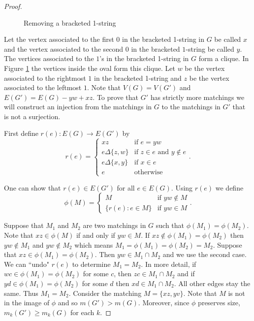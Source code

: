 \documentclass[12pt]{amsart}
\theoremstyle{plain}
\theoremstyle{definition}
\begin{document}
\begin{proof}
\begin{figure}[!ht]
\begin{center}
\caption{Removing a bracketed 1-string}
\label{fig:Bracketed1StringA}
\end{center}
\end{figure}

  
Let the vertex associated to the first 0 in the bracketed 1-string in $G$ be called $x$ and the vertex associated to the second 0 in the bracketed $1$-string be called $y$.  The vertices associated to the $1$'s in the bracketed 1-string in $G$ form a clique.  In Figure \ref{fig:Bracketed1StringA} the vertices inside the oval form this clique.  Let $w$ be the vertex associated to the rightmost $1$ in the bracketed 1-string and $z$ be the vertex associated to the leftmost $1$.    %
Note that $V(G) = V(G')$ and $E(G')= E(G)-yw+xz$. To prove that $G'$ has strictly more matchings we will construct an injection from the matchings in $G$ to the matchings in $G'$ that is not a surjection.


First define $r(e): E(G)\to E(G')$ by
$$r(e)=
\begin{cases}
xz  &\text{if $e=yw$}\\
e\Delta \{z,w\} &\text{if $z\in e$ and $y\notin e$}\\
e\Delta \{x,y\} &\text{if $x\in e$}\\%
e  &\text{otherwise}
\end{cases}.$$

One can show that $r(e)\in E(G')$ for all $e\in E(G)$.  Using $r(e)$ we define 
$$\phi(M)=
\begin{cases}
M  &\text{if $yw\notin M$}\\
\{r(e): e\in M\}  &\text{if $yw\in M$}
\end{cases}.$$



Suppose that $M_1$ and $M_2$ are two matchings in $G$ such that $\phi(M_1)=\phi(M_2)$.  Note that $xz\in \phi(M)$ if and only if $yw\in M$.  If $xz\notin \phi(M_1)=\phi(M_2)$ then $yw\notin M_1$ and $yw\notin M_2$ which means $M_1=\phi(M_1) = \phi(M_2) = M_2$.  Suppose that $xz\in \phi(M_1)=\phi(M_2)$.   Then $yw\in M_1\cap M_2$ and we use the second case.  We can ``undo" $r(e)$ to determine $M_1=M_2$.  In more detail, if $wc\in \phi(M_1)=\phi(M_2)$ for some $c$, then $zc\in M_1\cap M_2$ and if $yd\in \phi(M_1)=\phi(M_2)$ for some $d$ then $xd\in M_1\cap M_2$.  All other edges stay the same.  Thus $M_1=M_2$.  Consider the matching $M=\{xz, yv\}$.  Note that $M$ is not in the image of $\phi$ and so $m(G')>m(G)$.   Moreover, since $\phi$ preserves size, $m_k(G')\geq m_k(G)$ for each $k$.




\end{proof}
\end{document}

